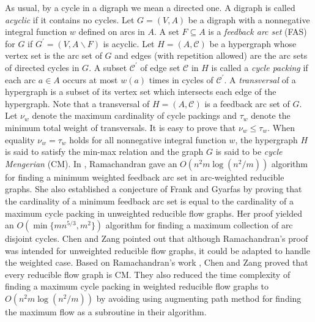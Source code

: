\documentclass[11pt]{article}
\begin{document}
As usual, by a cycle in a digraph we mean a directed one. A digraph is called \emph{acyclic} if it contains no cycles. Let $G=(V,A)$ be a digraph with a nonnegative integral function $w$ defined on arcs in $A$. A set $F\subseteq A$ is a \emph{feedback arc set} (FAS) for $G$ if $G^\prime=(V,A\backslash F)$ is acyclic. Let $H=(A,\mathcal{C})$ be a hypergraph whose vertex set is the arc set of $G$ and edges (with repetition allowed) are the arc sets of directed cycles in $G$. A subset $\mathcal{C}^\prime$ of edge set $\mathcal{C}$ in $H$ is called a \emph{cycle packing} if each arc $a\in A$ occurs at most $w(a)$ times in cycles of $\mathcal{C}^\prime$. A \emph{transversal} of a hypergraph is a subset of its vertex set which intersects each edge of the hypergraph. Note that a transversal of $H=(A,\mathcal{C})$ is a feedback arc set of $G$. Let $\nu_w$ denote the maximum cardinality of cycle packings and $\tau_w$ denote the minimum total weight of transversals. It is easy to prove that $\nu_w\leq\tau_w$. When equality $\nu_w=\tau_w$ holds for all nonnegative integral function $w$, the hypergraph $H$ is said to satisfy the min-max relation and the graph $G$ is said to be \emph{cycle Mengerian} (CM). In \cite{Rama1}, Ramachandran gave an $O(n^2m\log(n^2 / m))$ algorithm for finding a minimum weighted feedback arc set in arc-weighted reducible graphs. She \cite{Rama2} also established a conjecture of Frank and Gyarfas \cite{FraG} by proving that the cardinality of a minimum feedback arc set is equal to the cardinality of a maximum cycle packing  in unweighted reducible flow graphs. Her proof yielded an $O(\min\{mn^{5/3},m^2\})$ algorithm for finding a maximum collection of arc disjoint cycles. Chen and Zang \cite{CheZ} pointed out that although Ramachandran's proof \cite{Rama2} was intended for unweighted reducible flow graphs, it could be adapted to handle the weighted case. Based on Ramachandran's work \cite{Rama1,Rama2}, Chen and Zang proved that every reducible flow graph is CM. They also reduced the time complexity of finding a maximum cycle packing in weighted reducible flow graphs to $O(n^2 m\log(n^2/m))$  by avoiding using augmenting path method for finding the maximum flow as a subroutine in their algorithm. 
\end{document}
